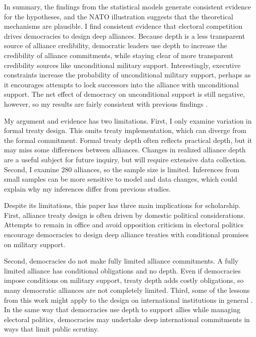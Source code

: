 \documentclass[12pt]{article}
\begin{document}
In summary, the findings from the statistical models generate consistent evidence for the hypotheses, and the NATO illustration suggests that the theoretical mechanisms are plausible. 
I find consistent evidence that electoral competition drives democracies to design deep alliances.  
Because depth is a less transparent source of alliance credibility, democratic leaders use depth to increase the credibility of alliance commitments, while staying clear of more transparent credibility sources like unconditional military support.
Interestingly, executive constraints increase the probability of unconditional military support, perhaps as it encourages attempts to lock successors into the alliance with unconditional support.
The net effect of democracy on unconditional support is still negative, however, so my results are fairly consistent with previous findings \citep{Mattes2012, Chibaetal2015, FjelstulReiter2019}.  


My argument and evidence has two limitations.
First, I only examine variation in formal treaty design. 
This omits treaty implementation, which can diverge from the formal commitment.   
Formal treaty depth often reflects practical depth, but it may miss some differences between alliances. 
Changes in realized alliance depth are a useful subject for future inquiry, but will require extensive data collection.
Second, I examine 280 alliances, so the sample size is limited. 
Inferences from small samples can be more sensitive to model and data changes, which could explain why my inferences differ from previous studies. 


Despite its limitations, this paper has three main implications for scholarship. 
First, alliance treaty design is often driven by domestic political considerations. 
Attempts to remain in office and avoid opposition criticism in electoral politics encourage democracies to design deep alliance treaties with conditional promises on military support. 


Second, democracies do not make fully limited alliance commitments. 
A fully limited alliance has conditional obligations and no depth.
Even if democracies impose conditions on military support, treaty depth adds costly obligations, so many democratic alliances are not completely limited.  
Third, some of the lessons from this work might apply to the design on international institutions in general \citep{DownesRocke1995, MartinSimmons1998, Koremenosetal2001, Thompson2010}.
In the same way that democracies use depth to support allies while managing electoral politics, democracies may undertake deep international commitments in ways that limit public scrutiny. 
\end{document}
